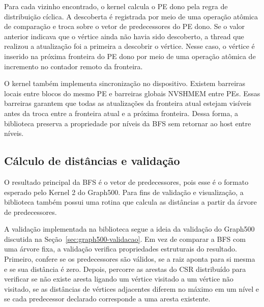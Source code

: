Para cada vizinho encontrado, o kernel calcula o PE dono pela regra de
distribuição cíclica. A descoberta é registrada por meio de uma operação atômica
de comparação e troca sobre o vetor de predecessores do PE dono. Se o valor
anterior indicava que o vértice ainda não havia sido descoberto, a thread que
realizou a atualização foi a primeira a descobrir o vértice. Nesse caso, o
vértice é inserido na próxima fronteira do PE dono por meio de uma operação
atômica de incremento no contador remoto da fronteira.

O kernel também implementa sincronização no dispositivo. Existem barreiras locais
entre blocos do mesmo PE e barreiras globais NVSHMEM entre PEs. Essas barreiras
garantem que todas as atualizações da fronteira atual estejam visíveis antes da
troca entre a fronteira atual e a próxima fronteira. Dessa forma, a biblioteca
preserva a propriedade por níveis da BFS sem retornar ao host entre níveis.

\subsection{Cálculo de distâncias e validação}
\label{sec:bib-validacao}

O resultado principal da BFS é o vetor de predecessores, pois esse é o formato
esperado pelo Kernel 2 do Graph500. Para fins de validação e visualização, a
biblioteca também possui uma rotina que calcula as distâncias a partir da árvore
de predecessores. 

A validação implementada na biblioteca segue a ideia da validação do
Graph500 discutida na Seção~\ref{sec:graph500-validacao}. Em vez de comparar a
BFS com uma árvore fixa, a validação verifica propriedades estruturais do
resultado. Primeiro, confere se os predecessores são válidos, se a raiz aponta
para si mesma e se sua distância é zero. Depois, percorre as arestas do CSR
distribuído para verificar se não existe aresta ligando um vértice visitado a um
vértice não visitado, se as distâncias de vértices adjacentes diferem no máximo
em um nível e se cada predecessor declarado corresponde a uma aresta existente.
